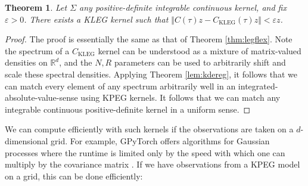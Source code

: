 \documentclass{article}
\newtheorem{theorem}{Theorem}
\theoremstyle{definition}
\newcommand{\KLEG}{\mathrm{KLEG}}
\begin{document}
\begin{theorem}
Let $\Sigma$ any positive-definite integrable continuous kernel, and fix $\varepsilon>0$.  There exists a KLEG kernel such that $\Vert C(\tau)z-C_\KLEG(\tau)z\Vert < \varepsilon z$. 
\end{theorem}
\begin{proof}
The proof is essentially the same as that of Theorem \ref{thm:legflex}.  Note the spectrum of a $C_\KLEG$ kernel can be understood as a mixture of matrix-valued densities on $\mathbb{R}^d$, and the $N,R$ parameters can be used to arbitrarily shift and scale these spectral densities.  Applying Theorem \ref{lem:kdereg}, it follows that we can match every element of any spectrum arbitrarily well in an integrated-absolute-value-sense using KPEG kernels.  It follows that we can match any integrable continuous positive-definite kernel in a uniform sense.
\end{proof}

We can compute efficiently with such kernels if the observations are taken on a $d$-dimensional grid.  For example, GPyTorch offers algorithms for Gaussian processes where the runtime is limited only by the speed with which one can multiply by the covariance matrix \cite{gardner2018gpytorch}.  If we have observations from a KPEG model on a grid, this can be done efficiently:
\end{document}
